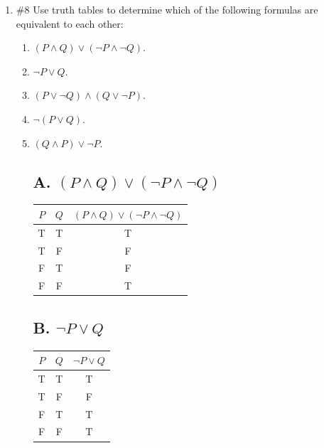 \documentclass[12pt]{exam}
\begin{document}
\begin {enumerate} [listparindent=1.5em]
\begin {enumerate}
\item Find a formula using only the connectives $\land, \lor, and \lnot$ that is
equivalent to P|Q.

$(P \lor Q) \land (\lnot P \lor \lnot Q)$

\item Find formulas using only the connective|that are equivalent to $\lnot P, P
\lor Q, and P \land Q.$

$\lnot P = P|P$

$P \lor Q = (P|Q)$

$P \land Q = (P|Q)|(P|Q)$
\end {enumerate}

\item $\#8$ Use truth tables to determine which of the following formulas are
equivalent to each other:
\begin {enumerate} 
\item $(P \land Q) \lor (\lnot P \land \lnot Q)$.
\item $\lnot P \lor Q$.
\item $(P \lor \lnot Q) \land (Q \lor \lnot P)$.
\item $\lnot (P \lor Q)$.
\item $(Q \land P) \lor \lnot P$.


\subsection*{A. $(P \land Q) \lor (\neg P \land \neg Q)$}
\begin{tabular}{cc|c}
\toprule
$P$ & $Q$ & $(P \land Q) \lor (\neg P \land \neg Q)$ \\
\midrule
T & T & T \\
T & F & F \\
F & T & F \\
F & F & T \\
\bottomrule
\end{tabular}

\subsection*{B. $\neg P \lor Q$}
\begin{tabular}{cc|c}
\toprule
$P$ & $Q$ & $\neg P \lor Q$ \\
\midrule
T & T & T \\
T & F & F \\
F & T & T \\
F & F & T \\
\bottomrule
\end{tabular}


\end{enumerate}
\end{enumerate}
\end{document}
